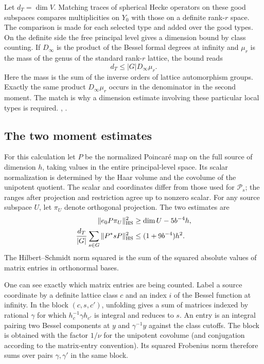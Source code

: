 Let \(d_T=\dim V\). Matching traces of spherical Hecke operators on these good subspaces compares multiplicities on \(Y_0\) with those on a definite rank-\(r\) space. The comparison is made for each selected type and added over the good types. On the definite side the free principal level gives a dimension bound by class counting. If \(D_\infty\) is the product of the Bessel formal degrees at infinity and \(\mu_r\) is the mass of the genus of the standard rank-\(r\) lattice, the bound reads
\[
                      d_T\le |G|D_\infty\mu_r .
\]
Here the mass is the sum of the inverse orders of lattice automorphism groups. Exactly the same product \(D_\infty\mu_r\) occurs in the denominator in the second moment. The match is why a dimension estimate involving these particular local types is required. , .

\subsection{The two moment estimates}

For this calculation let \(P\) be the normalized Poincar\'e map on the full source of dimension \(h\), taking values in the entire principal-level space. Its scalar normalization is determined by the Haar volume and the covolume of the unipotent quotient. The scalar and coordinates differ from those used for \(\mathcal P_s\); the ranges after projection and restriction agree up to nonzero scalar. For any source subspace \(U\), let \(\pi_U\) denote orthogonal projection. The two estimates are
\begin{align}
 \|e_0 P\pi_U\|_{\rm HS}^2&\ge \dim U-5b^{-4}h,\label{eq:bridge-isom}\\
 \frac{d_T}{|G|}\sum_{s\in G}\|P^*sP\|_{\rm HS}^2
                 &\le (1+9b^{-4})h^2.\label{eq:bridge-moment}
\end{align}
The Hilbert--Schmidt norm squared is the sum of the squared absolute values of matrix entries in orthonormal bases.

One can see exactly which matrix entries are being counted. Label a source coordinate by a definite lattice class \(c\) and an index \(i\) of the Bessel function at infinity. In the block \((c,s,c')\), unfolding gives a sum of matrices indexed by rational \(\gamma\) for which \(h_c^{-1}\gamma h_{c'}\) is integral and reduces to \(s\). An entry is an integral pairing two Bessel components at \(y\) and \(\gamma^{-1}y\) against the class cutoffs. The block is obtained with the factor \(1/\nu\) for the unipotent covolume (and conjugation according to the matrix-entry convention). Its squared Frobenius norm therefore sums over pairs \(\gamma,\gamma'\) in the same block.

